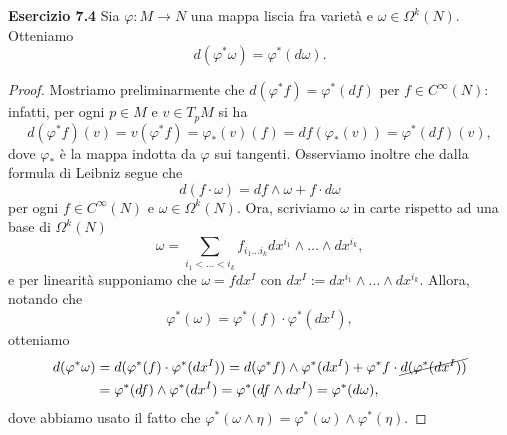 \documentclass[a4paper]{article}
\theoremstyle{definition}
\theoremstyle{definition}
\theoremstyle{remark}
\theoremstyle{definition}
\begin{document}
\textbf{Esercizio 7.4}
Sia $\varphi : M \to N$ una mappa liscia fra varietà e $\omega \in \Omega^k(N)$.
Otteniamo
\[
    d(\varphi^*\omega) = \varphi^*(d\omega).
\]
\begin{proof}
    Mostriamo preliminarmente che $d(\varphi^*f) = \varphi^*(df)$ per $f\in C^\infty(N)$: infatti, per ogni $p\in M$ e $v\in T_pM$ si ha
    \[
        d(\varphi^*f)(v)=v(\varphi^*f)=\varphi_*(v)(f)=df(\varphi_*(v))=\varphi^*(df)(v),
    \]
    dove $\varphi_*$ è la mappa indotta da $\varphi$ sui tangenti.
    Osserviamo inoltre che dalla formula di Leibniz segue che $$d(f \cdot \omega) = df \wedge \omega + f \cdot d\omega$$ per ogni $f\in C^\infty(N)$ e $\omega\in \Omega^k(N)$.
    Ora, scriviamo $\omega$ in carte rispetto ad una base di $\Omega^k(N)$
    \[
        \omega = \sum_{i_1<\ldots<i_k} f_{i_1\ldots i_k} dx^{i_1}\wedge \ldots \wedge dx^{i_k},
    \]
    e per linearità supponiamo che $\omega = f dx^I$ con $dx^I:=dx^{i_1}\wedge \ldots \wedge dx^{i_k}$. Allora, notando che $$\varphi^*(\omega) = \varphi^*(f) \cdot \varphi^*(dx^I),$$
    otteniamo
    \[
        \begin{aligned}
            d(\varphi^*\omega) & = d(\varphi^*(f) \cdot \varphi^*(dx^I)) = d(\varphi^*f) \wedge \varphi^*(dx^I) + \varphi^*f \cdot \cancel{d(\varphi^*(dx^I))} \\
                               & = \varphi^*(df) \wedge \varphi^*(dx^I) = \varphi^*(df \wedge dx^I) = \varphi^*(d\omega),
        \end{aligned}
    \]
    dove abbiamo usato il fatto che $\varphi^*(\omega\wedge\eta)=\varphi^*(\omega)\wedge\varphi^*(\eta)$.
\end{proof}
\end{document}
